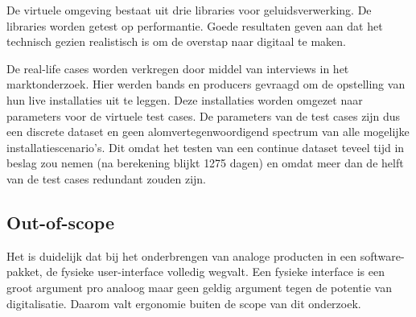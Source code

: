 De virtuele omgeving bestaat uit drie libraries voor geluidsverwerking. De libraries worden getest op performantie. Goede resultaten geven aan dat het technisch gezien realistisch is om de overstap naar digitaal te maken.

De real-life cases worden verkregen door middel van interviews in het marktonderzoek. Hier werden bands en producers gevraagd om de opstelling van hun live installaties uit te leggen. Deze installaties worden omgezet naar parameters voor de virtuele test cases. De parameters van de test cases zijn dus een discrete dataset en geen alomvertegenwoordigend spectrum van alle mogelijke installatiescenario's. Dit omdat het testen van een continue dataset teveel tijd in beslag zou nemen (na berekening blijkt 1275 dagen) en omdat meer dan de helft van de test cases redundant zouden zijn.

\subsection{Out-of-scope}

Het is duidelijk dat bij het onderbrengen van analoge producten in een software-pakket, de fysieke user-interface volledig wegvalt. Een fysieke interface is een groot argument pro analoog maar geen geldig argument tegen de potentie van digitalisatie. Daarom valt ergonomie buiten de scope van dit onderzoek.

\iffalse

\section{\IfLanguageName{dutch}{Methodologie}{Methodology}}
\label{sec:methodologie}

Zoals eerder vermeld wordt er een marktonderzoek en technische test uitgevoerd. Deze worden verder in het artikel respectievelijk vernoemd als de emotionele en empirische test.

De emotionele test gaat aan de hand van interviews de maat nagaan waarin of de muzieksector de digitalisatie verwelkomt. Voor de interviews werd gezocht naar muzikanten, bands, muzikaal artiesten, producers en opnamestudio's. De test beantwoordt of er vraag is naar digitalisatie en wie er baat bij zou hebben. Dit onderzoek beschouwt ook de live muziekinstallatie van de artiesten en een paar real-life usecases die ze daarvoor konden geven.

De emotionele test heeft twee uitkomsten: ...

\fi

